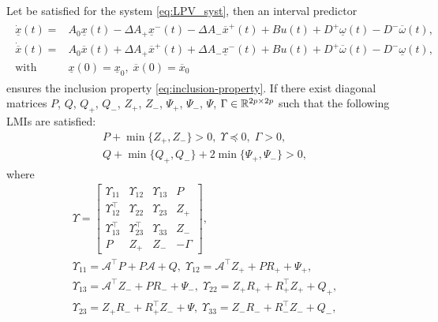 \begin{theorem}
	\label{thm:main}
	\begin{leftbar}[theorembar]
	Let  be satisfied for the system \eqref{eq:LPV_syst}, then an interval predictor
	\begin{align}
	\label{eq:interval-predictor}
	\begin{split}
	\dot{\underline{x}}(t) = {} & A_{0}\underline{x}(t)-\Delta A_{+}\underline{x}^{-}(t)-\Delta A_{-}\overline{x}^{+}(t) +Bu(t) +D^{+}\underline{\omega}(t)-D^{-}\overline{\omega}(t),\\
	\dot{\overline{x}}(t) = {} & A_{0}\overline{x}(t)+\Delta A_{+}\overline{x}^{+}(t)+\Delta A_{-}\underline{x}^{-}(t)  +Bu(t) +D^{+}\overline{\omega}(t)-D^{-}\underline{\omega}(t), \\
	\text{with }\, & \underline{x}(0)=\underline{x}_{0},\;\overline{x}(0)=\overline{x}_{0} 
	\end{split}
	\end{align}
	ensures the inclusion property \eqref{eq:inclusion-property}. 
	If there exist diagonal matrices $P$, $Q$, $Q_{+}$, $Q_{-}$, $Z_{+}$, $Z_{-}$, $\Psi_{+}$, $\Psi_{-}$, $\Psi$, $\Gamma\in\mathbb{R}^{2p\times2p}$ such that the following LMIs are satisfied:
	\begin{gather*}
	P+\min\{Z_{+},Z_{-}\}>0,\;\Upsilon\preceq0,\;\Gamma>0,\\
	Q+\min\{Q_{+},Q_{-}\}+2\min\{\Psi_{+},\Psi_{-}\}>0,
	\end{gather*}
	where{
		\begin{gather*}
		\Upsilon=\left[\begin{array}{cccc}
		\Upsilon_{11} & \Upsilon_{12} & \Upsilon_{13} & P\\
		\Upsilon_{12}^{\top} & \Upsilon_{22} & \Upsilon_{23} & Z_{+}\\
		\Upsilon_{13}^{\top} & \Upsilon_{23}^{\top} & \Upsilon_{33} & Z_{-}\\
		P & Z_{+} & Z_{-} & -\Gamma
		\end{array}\right],\\
		\Upsilon_{11}=\mathcal{A}^{\top}P+P\mathcal{A}+Q,\;\Upsilon_{12}=\mathcal{A}^{\top}Z_{+}+PR_{+}+\Psi_{+},\\
		\Upsilon_{13}=\mathcal{A}^{\top}Z_{-}+PR_{-}+\Psi_{-},\;\Upsilon_{22}=Z_{+}R_{+}+R_{+}^{\top}Z_{+}+Q_{+},\\
		\Upsilon_{23}=Z_{+}R_{-}+R_{+}^{\top}Z_{-}+\Psi,\;\Upsilon_{33}=Z_{-}R_{-}+R_{-}^{\top}Z_{-}+Q_{-},\\

\end{gather*}}
\end{leftbar}
\end{theorem}
